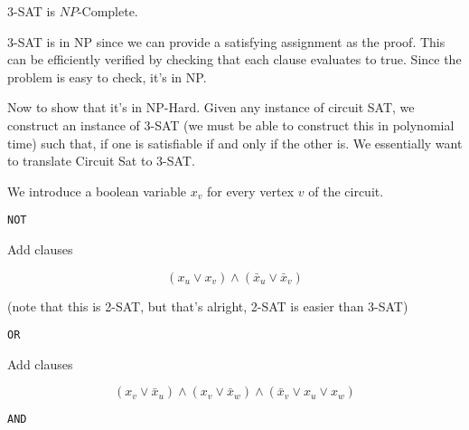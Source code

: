 \documentclass[12pt]{article}
\begin{document}
  {
    $3$-SAT is $NP$-Complete.
  }
  {
    3-SAT is in NP since we can provide a satisfying assignment as the proof.
    This can be efficiently verified by checking that each clause evaluates to
    true. Since the problem is easy to check, it's in NP.

    Now to show that it's in NP-Hard. Given any instance of circuit SAT, we
    construct an instance of 3-SAT (we must be able to construct this in
    polynomial time) such that, if one is satisfiable if and only if the other
    is. We essentially want to translate Circuit Sat to 3-SAT.

    We introduce a boolean variable $x_v$ for every vertex $v$ of the circuit.

    {\texttt{NOT}}

    \begin{center}
    \end{center}

    Add clauses

    \[
      (x_u \vee x_v) \wedge (\bar x_u \vee \bar x_v)
    \]

    (note that this is 2-SAT, but that's alright, 2-SAT is easier than 3-SAT)

    {\texttt{OR}}

    \begin{center}
    \end{center}

    Add clauses

    \[
      (x_v \vee \bar x_u) \wedge (x_v \vee \bar x_w) \wedge (\bar x_v \vee x_u
      \vee x_w)
    \]

    {\texttt{AND}}

}
\end{document}
